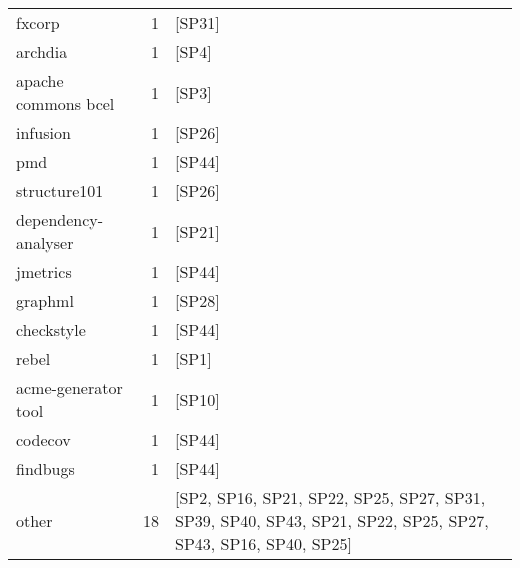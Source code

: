 \begin{tabular}{lrl}
              fxcorp &      1 &                                                                                                       [SP31] \\
             archdia &      1 &                                                                                                        [SP4] \\
 apache commons bcel &      1 &                                                                                                        [SP3] \\
            infusion &      1 &                                                                                                       [SP26] \\
                 pmd &      1 &                                                                                                       [SP44] \\
        structure101 &      1 &                                                                                                       [SP26] \\
 dependency-analyser &      1 &                                                                                                       [SP21] \\
            jmetrics &      1 &                                                                                                       [SP44] \\
             graphml &      1 &                                                                                                       [SP28] \\
          checkstyle &      1 &                                                                                                       [SP44] \\
               rebel &      1 &                                                                                                        [SP1] \\
 acme-generator tool &      1 &                                                                                                       [SP10] \\
             codecov &      1 &                                                                                                       [SP44] \\
            findbugs &      1 &                                                                                                       [SP44] \\
               other &     18 &  [SP2, SP16, SP21, SP22, SP25, SP27, SP31, SP39, SP40, SP43, SP21, SP22, SP25, SP27, SP43, SP16, SP40, SP25] \\
\bottomrule
\end{tabular}
